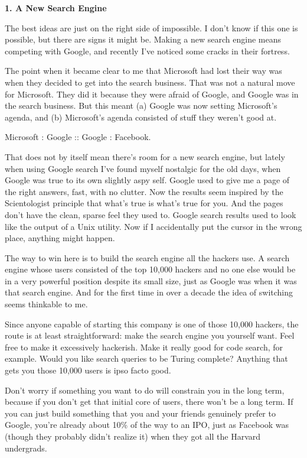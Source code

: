 \documentclass[12pt]{book}
\begin{document}
\textbf{1. A New Search Engine}

The best ideas are just on the right side of impossible. I don't know if
this one is possible, but there are signs it might be. Making a new
search engine means competing with Google, and recently I've noticed
some cracks in their fortress.

The point when it became clear to me that Microsoft had lost their way
was when they decided to get into the search business. That was not a
natural move for Microsoft. They did it because they were afraid of
Google, and Google was in the search business. But this meant (a) Google
was now setting Microsoft's agenda, and (b) Microsoft's agenda consisted
of stuff they weren't good at.

Microsoft : Google :: Google : Facebook.

That does not by itself mean there's room for a new search engine, but
lately when using Google search I've found myself nostalgic for the old
days, when Google was true to its own slightly aspy self. Google used to
give me a page of the right answers, fast, with no clutter. Now the
results seem inspired by the Scientologist principle that what's true is
what's true for you. And the pages don't have the clean, sparse feel
they used to. Google search results used to look like the output of a
Unix utility. Now if I accidentally put the cursor in the wrong place,
anything might happen.

The way to win here is to build the search engine all the hackers use. A
search engine whose users consisted of the top 10,000 hackers and no one
else would be in a very powerful position despite its small size, just
as Google was when it was that search engine. And for the first time in
over a decade the idea of switching seems thinkable to me.

Since anyone capable of starting this company is one of those 10,000
hackers, the route is at least straightforward: make the search engine
you yourself want. Feel free to make it excessively hackerish. Make it
really good for code search, for example. Would you like search queries
to be Turing complete? Anything that gets you those 10,000 users is ipso
facto good.

Don't worry if something you want to do will constrain you in the long
term, because if you don't get that initial core of users, there won't
be a long term. If you can just build something that you and your
friends genuinely prefer to Google, you're already about 10\% of the way
to an IPO, just as Facebook was (though they probably didn't realize it)
when they got all the Harvard undergrads.
\end{document}
